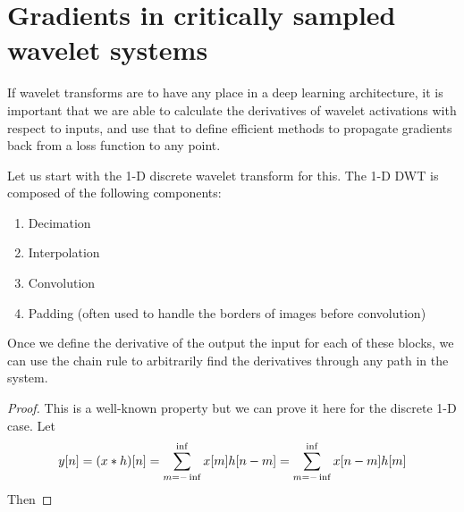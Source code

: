 \section{Gradients in critically sampled wavelet systems}

If wavelet transforms are to have any place in a deep learning architecture, it
is important that we are able to calculate the derivatives of wavelet
activations with respect to inputs, and use that to define efficient methods to
propagate gradients back from a loss function to any point. 

Let us start with the 1-D discrete wavelet transform for this. The 1-D DWT is
composed of the following components:

\begin{enumerate}
  \item Decimation
  \item Interpolation
  \item Convolution 
  \item Padding (often used to handle the borders of images before convolution)
\end{enumerate}

Once we define the derivative of the output \wrt the input for each of these
blocks, we can use the chain rule to arbitrarily find the derivatives through
any path in the system.



\begin{proof}
  This is a well-known property but we can prove it here for the discrete 1-D case. Let
  $$y[n] = (x \ast h)[n] = \sum_{m=-\inf}^{\inf} x[m]h[n-m] = \sum_{m=-\inf}^{\inf} x[n-m]h[m] $$
  Then 
\end{proof}

